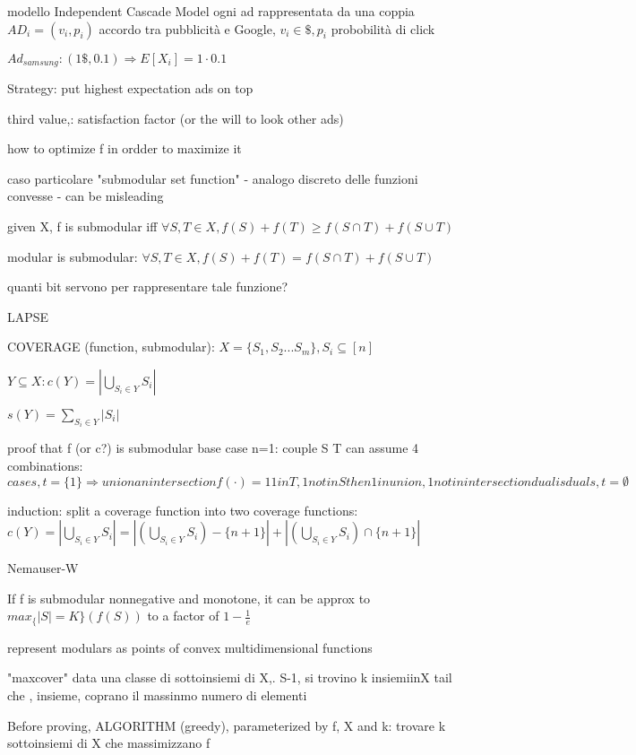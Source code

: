\documentclass{report}
\begin{document}
	modello Independent Cascade Model
	ogni ad rappresentata da una coppia $AD_i = (v_i, p_i)$ accordo tra pubblicità e Google, $v_i \in \$, p_i$ probobilità di click
	
	$Ad_{samsung} : (1\$, 0.1) \Rightarrow E[X_i] = 1 \cdot 0.1$
	
	Strategy: put highest expectation ads on top
	
	third value,: satisfaction factor (or the will to look other ads)
	
	how to optimize f in ordder to maximize it
	
	caso particolare "submodular set function" - analogo discreto delle funzioni convesse - can be misleading
	
	given X, f is submodular iff $\forall S, T \in X, f(S)+f(T) \geq f(S\cap T) + f(S\cup T)$
	
	modular is submodular: $\forall S, T \in X, f(S)+f(T) = f(S\cap T) + f(S\cup T)$

	quanti bit servono per rappresentare tale funzione?
	
	LAPSE
	
	COVERAGE (function, submodular): $X=\{S_1, S_2...S_m\}, S_i \subseteq [n]$
	
	$Y\subseteq X : c(Y) = |\bigcup_{S_i \in Y}S_i|$
	
	
	$s(Y) = \sum_{S_i \in Y} |S_i|$
	
	
	proof that f (or c?) is submodular
	base case n=1: couple S T can assume 4 combinations: $
	case s, t = \{1\} \Rightarrow union an intersection f(\cdot)= 1	
	1 in T, 1 not in S then 1 in union, 1 not in intersection
	dual is dual
	s, t = \emptyset
	$
	
	induction: split a coverage function into two coverage functions: $c(Y) = |\bigcup_{S_i \in Y}S_i| = |(\bigcup_{S_i \in Y}S_i)-\{n+1\}| + |(\bigcup_{S_i \in Y}S_i) \cap \{n+1\}|$
	
	Nemauser-W
	
	If f is submodular nonnegative and monotone, it can be approx to $max_\{|S|=K\}(f(S))$ to a factor of $1- \frac{1}{e}$
	
	represent modulars as points of convex multidimensional functions
	
	
	"maxcover" data una classe di sottoinsiemi di X,. S-1, si trovino k insiemiinX tail che , insieme, coprano il massinmo numero di elementi
	
	
	Before proving, ALGORITHM (greedy), parameterized by f, X and k: trovare k sottoinsiemi di X che massimizzano f
	
\end{document}
